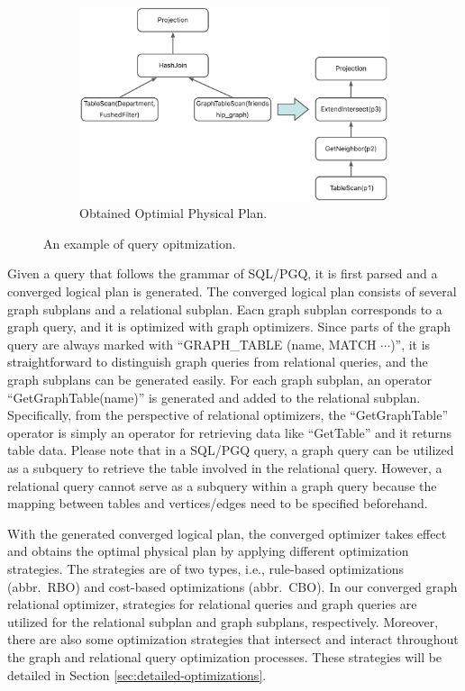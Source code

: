\begin{figure}
\begin{subfigure}[b]{0.4\linewidth}
        \includegraphics[width=\linewidth]{./figures/converged-physical-plan.png}
        \caption{Obtained Optimial Physical Plan.}
        \label{fig:physical-plan-optimized}
    \end{subfigure}
    \caption{An example of query opitmization.}
    \label{fig:query-grtree-example}
\end{figure}


Given a query that follows the grammar of SQL/PGQ, it is first parsed and a converged logical plan is generated.
The converged logical plan consists of several graph subplans and a relational subplan.
Eacn graph subplan corresponds to a graph query, and it is optimized with graph optimizers.
Since parts of the graph query are always marked with ``GRAPH\_TABLE (name, MATCH $\cdots$)'', it is straightforward to distinguish graph queries from relational queries, and the graph subplans can be generated easily.
For each graph subplan, an operator ``GetGraphTable(name)'' is generated and added to the relational subplan.
Specifically, from the perspective of relational optimizers, the ``GetGraphTable'' operator is simply an operator for retrieving data like ``GetTable'' and it returns table data.
Please note that in a SQL/PGQ query, a graph query can be utilized as a subquery to retrieve the table involved in the relational query.
However, a relational query cannot serve as a subquery within a graph query because the mapping between tables and vertices/edges need to be specified beforehand.


With the generated converged logical plan, the converged optimizer takes effect and obtains the optimal physical plan by applying different optimization strategies.
The strategies are of two types, i.e., rule-based optimizations (abbr.~RBO) and cost-based optimizations (abbr.~CBO).
In our converged graph relational optimizer, strategies for relational queries and graph queries are utilized for the relational subplan and graph subplans, respectively.
Moreover, there are also some optimization strategies that intersect and interact throughout the graph and relational query optimization processes.
These strategies will be detailed in Section \ref{sec:detailed-optimizations}.

